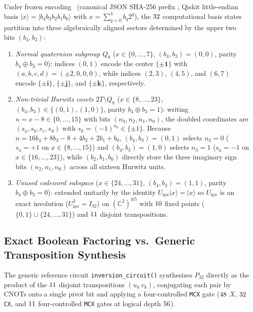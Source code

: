 \documentclass[aps,prx,twocolumn,superscriptaddress,nofootinbib]{revtex4-2}
\begin{document}
Under frozen encoding \btEncVer\ (canonical JSON SHA-256 prefix \btEncSha; Qiskit little-endian basis $|x\rangle = |b_4 b_3 b_2 b_1 b_0\rangle$ with $x = \sum_{q=0}^4 b_q 2^q$), the $32$ computational basis states partition into three algebraically aligned sectors determined by the upper two bits $(b_4, b_3)$:
\begin{enumerate}
  \item \emph{Normal quaternion subgroup $Q_8$} ($x \in \{0,\dots,7\}$, $(b_4,b_3) = (0,0)$, parity $b_4 \oplus b_3 = 0$): indices $(0,1)$ encode the center $\{\pm\mathbf{1}\}$ with $(a,b,c,d) = (\pm 2,0,0,0)$, while indices $(2,3)$, $(4,5)$, and $(6,7)$ encode $\{\pm\mathbf{i}\}$, $\{\pm\mathbf{j}\}$, and $\{\pm\mathbf{k}\}$, respectively.
  \item \emph{Non-trivial Hurwitz cosets $2T \setminus Q_8$} ($x \in \{8,\dots,23\}$, $(b_4,b_3) \in \{(0,1),(1,0)\}$, parity $b_4 \oplus b_3 = 1$): writing $n = x - 8 \in \{0,\dots,15\}$ with bits $(n_3,n_2,n_1,n_0)$, the doubled coordinates are $(s_a,s_b,s_c,s_d)$ with $s_k = (-1)^{n_k} \in \{\pm 1\}$. Because $n = 16 b_4 + 8 b_3 - 8 + 4 b_2 + 2 b_1 + b_0$, $(b_4,b_3) = (0,1)$ selects $n_3 = 0$ ($s_a = +1$ on $x \in \{8,\dots,15\}$) and $(b_4,b_3) = (1,0)$ selects $n_3 = 1$ ($s_a = -1$ on $x \in \{16,\dots,23\}$), while $(b_2,b_1,b_0)$ directly store the three imaginary sign bits $(n_2,n_1,n_0)$ across all sixteen Hurwitz units.
  \item \emph{Unused codeword subspace} ($x \in \{24,\dots,31\}$, $(b_4,b_3) = (1,1)$, parity $b_4 \oplus b_3 = 0$): extended unitarily by the identity $U_{\mathrm{inv}}|x\rangle = |x\rangle$ so $U_{\mathrm{inv}}$ is an exact involution ($U_{\mathrm{inv}}^2 = I_{32}$) on $(\mathbb{C}^2)^{\otimes 5}$ with $10$ fixed points ($\{0,1\} \cup \{24,\dots,31\}$) and $11$ disjoint transpositions.
\end{enumerate}

\subsection{Exact Boolean Factoring vs.\ Generic Transposition Synthesis}
The generic reference circuit \texttt{inversion\_circuit()} synthesizes $P_{32}$ directly as the product of the $11$ disjoint transpositions $(u_k\, v_k)$, conjugating each pair by CNOTs onto a single pivot bit and applying a four-controlled \texttt{MCX} gate ($48$ $X$, $32$ \texttt{CX}, and $11$ four-controlled \texttt{MCX} gates at logical depth $56$).
\end{document}
